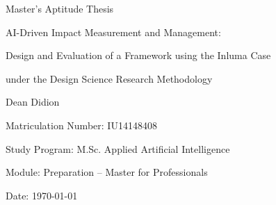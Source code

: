 \documentclass[12pt]{report}
\begin{document}
\begin{titlepage}
    \centering

    {\LARGE Master's Aptitude Thesis\par}
    \vspace{0.5cm}
    {\Large AI-Driven Impact Measurement and Management: \par
    Design and Evaluation of a Framework using the Inluma Case \par
    under the Design Science Research Methodology \par}
    \vspace{1.5cm}

    {\large Dean Didion \par}
    Matriculation Number: IU14148408 \par
    \vspace{1.5cm}

    Study Program: M.Sc. Applied Artificial Intelligence \par
    Module: Preparation – Master for Professionals \par
    \vfill

    Date: \today
\end{titlepage}




\tableofcontents
\listoffigures

\newpage















\nocite{*}
\printbibliography

\clearpage

\appendix


\end{document}
